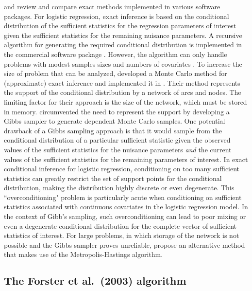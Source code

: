 \documentclass[article, shortnames]{jss}
\begin{document}
\cite{Oster:2002} and \cite{Oster:2003} review and compare exact
methods implemented in various software packages. For logistic
regression, exact inference is based on the conditional
distribution of the sufficient statistics for the regression
parameters of interest given the sufficient statistics for the
remaining nuisance parameters. A recursive algorithm for
generating the required conditional distribution is implemented in
the commercial software package  \citep{LogXact}.
However, the algorithm can only handle problems with modest
samples sizes and numbers of covariates \citep{Corcoran:2001}. To
increase the size of problem that can be analyzed,
\citet{Mehta:2000} developed a Monte Carlo method for
(approximate) exact inference and implemented it in .
Their method represents the support of the conditional
distribution by a network of arcs and nodes. The limiting factor
for their approach is the size of the network, which must be
stored in memory. \citet{Forster:1996} circumvented the need to
represent the support by developing a Gibbs sampler to generate
dependent Monte Carlo samples. One potential drawback of a Gibbs
sampling approach is that it would sample from the conditional
distribution of a particular sufficient statistic given the
observed values of the sufficient statistics for the nuisance
parameters \emph{and} the current values of the sufficient
statistics for the remaining parameters of interest. In exact
conditional inference for logistic regression, conditioning on too
many sufficient statistics can greatly restrict the set of support
points for the conditional distribution, making the distribution
highly discrete or even degenerate. This ``overconditioning"
problem is particularly acute when conditioning on sufficient
statistics associated with continuous covariates in the logistic
regression model. In the context of Gibb's sampling, such
overconditioning can lead to poor mixing or even a degenerate
conditional distribution for the complete vector of sufficient
statistics of interest. For large problems, in which storage of
the network is not possible and the Gibbs sampler proves
unreliable, \citet{Forster:2003} propose an alternative method
that makes use of the Metropolis-Hastings algorithm.

\subsection[The Forster et al. (2003) algorithm]{The Forster et al.\ (2003) algorithm}
\end{document}
